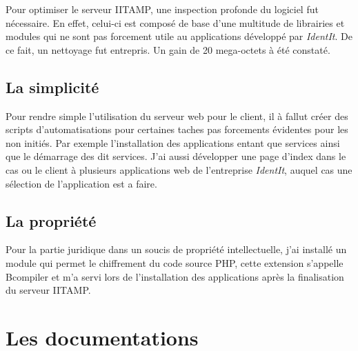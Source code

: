 Pour optimiser le serveur IITAMP, une inspection profonde du logiciel
fut nécessaire. En effet, celui-ci est composé de base d'une multitude de
librairies et modules qui ne sont pas forcement utile au applications
développé par \emph{IdentIt}. De ce fait, un nettoyage fut entrepris. Un
gain de 20 mega-octets à été constaté.

\subsection{La simplicité} %
\label{sub:La simplicité}

Pour rendre simple l'utilisation du serveur web pour le client, il à
fallut créer des scripts d'automatisations pour certaines taches pas
forcements évidentes pour les non initiés. Par exemple l'installation des
applications entant que services ainsi que le démarrage des dit services.
J'ai aussi développer une page d'index dans le cas ou le client à
plusieurs applications web de l'entreprise \emph{IdentIt}, auquel cas une
sélection de l'application est a faire.

\subsection{La propriété} %
\label{sub:La propriété}

Pour la partie juridique dans un soucis de propriété intellectuelle,
j'ai installé un module qui permet le chiffrement du code source PHP,
cette extension s'appelle Bcompiler et m'a servi lors de l'installation
des applications après la finalisation du serveur IITAMP.

\section{Les documentations} %
\label{sec:Les documentations}

